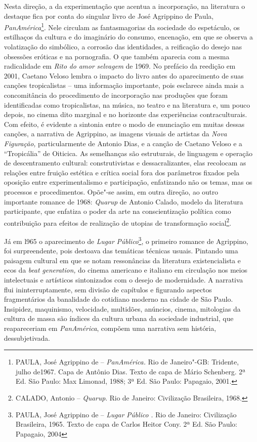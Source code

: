 Nesta direção, a da experimentação que acentua a incorporação, na
literatura o destaque fica por conta do singular livro de José Agrippino
de Paula, \emph{PanAmérica}\footnote{\textsc{PAULA}, José Agrippino de --
  \emph{PanAmérica.} Rio de Janeiro"-\textsc{GB}: Tridente, julho de1967. Capa de
  Antônio Dias. Texto de capa de Mário Schenberg. 2ª Ed. São Paulo: Max
  Limonad, 1988; 3ª Ed. São Paulo: Papagaio, 2001.}. Nele circulam as
fantasmagorias da sociedade do espetáculo, os estilhaços da cultura e do
imaginário do consumo, encenação, em que se observa a volatização do
simbólico, a corrosão das identidades, a reificação do desejo nas
obsessões eróticas e na pornografia. O que também aparecia com a mesma
radicalidade em \emph{Rito do amor selvagem} de 1969. No prefácio da
reedição em 2001, Caetano Veloso lembra o impacto do livro antes do
aparecimento de suas canções tropicalistas -- uma informação importante,
pois esclarece ainda mais a concomitância do procedimento de
incorporação nas produções que foram identificadas como tropicalistas,
na música, no teatro e na literatura e, um pouco depois, no cinema dito
marginal e no horizonte das experiências contraculturais. Com efeito, é
evidente a sintonia entre o modo de enunciação em muitas dessas canções,
a narrativa de Agrippino, as imagens visuais de artistas da \emph{Nova
Figuração,} particularmente de Antonio Dias, e a canção de Caetano
Veloso e a ``Tropicália'' de Oiticica. As semelhanças são estruturais,
de linguagem e operação de descentramento cultural: construtivistas e
dessacralizantes, elas recolocam as relações entre fruição estética e
crítica social fora dos parâmetros fixados pela oposição entre
experimentalismo e participação, enfatizando não os temas, mas os
processos e procedimentos. Opõe"-se assim, em outra direção, ao outro
importante romance de 1968: \emph{Quarup} de Antonio Calado, modelo da
literatura participante, que enfatiza o poder da arte na conscientização
política como contribuição para efeitos de realização de utopias de
transformação social\footnote{\textsc{CALADO}, Antonio -- \emph{Quarup}. Rio de
  Janeiro: Civilização Brasileira, 1968.}.

Já em l965 o aparecimento de \emph{Lugar Público}\footnote{\textsc{PAULA}, José
  Agrippino de -- \emph{Lugar Público .} Rio de Janeiro: Civilização
  Brasileira, 1965. Texto de capa de Carlos Heitor Cony. 2ª Ed. São
  Paulo: Papagaio, 2004}, o primeiro romance de Agrippino, foi
surpreendente, pois destoava das temáticas técnicas usuais. Pintando uma
paisagem cultural em que se notam ressonâncias da literatura
existencialista e ecos da \emph{beat generation,} do cinema americano e
italiano em circulação nos meios intelectuais e artísticos sintonizados
com o desejo de modernidade. A narrativa flui ininterruptamente, sem
divisão de capítulos e figurando aspectos fragmentários da banalidade do
cotidiano moderno na cidade de São Paulo. Insipidez, maquinismo,
velocidade, multidões, anúncios, cinema, mitologias da cultura de massa
são índices da cultura urbana da sociedade industrial, que reapareceriam
em \emph{PanAmérica}, compõem uma narrativa sem história,
dessubjetivada.

